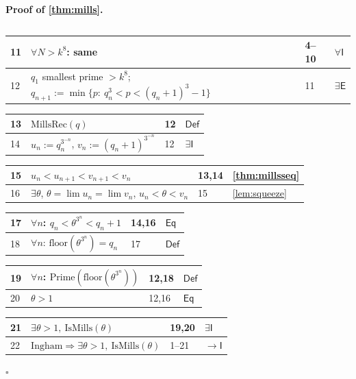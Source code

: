 \documentclass[11pt,reqno]{amsart}
\theoremstyle{blueplain}
\renewcommand{\qedsymbol}{\textcolor{proofqed}{\ensuremath{\square}}}
\renewenvironment{proof}[1][Proof]{\par\noindent\textbf{\textcolor{proofhead}{#1.}}\par\nobreak}{\par\nobreak\hfill\qedsymbol}
\numberwithin{equation}{section}
\begin{document}
\begin{proof}[\textbf{Proof of \cref{thm:mills}}]
{\begin{tabular}{|m{0.7cm}|m{12cm}|m{1.4cm}|m{2.5cm}|}
		\end{tabular}%
		\noindent \newline
		\noindent
		\begin{tabular}{|m{0.7cm}|m{12cm}|m{1.4cm}|m{2.5cm}|}
			\hline
			11 & $\forall N>k^{8}$: same & 4--10 & $\forall\mathsf{I}$ \\ \hline
			12 & $q_1$ smallest prime $>k^{8}$; $q_{n+1}:=\min\{p:\ q_n^{3}<p<(q_n+1)^{3}-1\}$ & 11 & $\exists\mathsf{E}$ \\
		\end{tabular}%
		\noindent \newline
		\noindent
		\begin{tabular}{|m{0.7cm}|m{12cm}|m{1.4cm}|m{2.5cm}|}
			\hline
			13 & $\mathrm{MillsRec}(q)$ & 12 & $\mathsf{Def}$ \\ \hline
			14 & $u_n:=q_n^{3^{-n}}$, $v_n:=(q_n+1)^{3^{-n}}$ & 12 & $\exists\mathsf{I}$ \\
		\end{tabular}%
		\noindent \newline
		\noindent
		\begin{tabular}{|m{0.7cm}|m{12cm}|m{1.4cm}|m{2.5cm}|}
			\hline
			15 & $u_n<u_{n+1}<v_{n+1}<v_n$ & 13,14 & \cref{thm:millsseq} \\ \hline
			16 & $\exists\theta$, $\theta=\lim u_n=\lim v_n$, $u_n<\theta<v_n$ & 15 & \cref{lem:squeeze} \\
		\end{tabular}%
		\noindent \newline
		\noindent
		\begin{tabular}{|m{0.7cm}|m{12cm}|m{1.4cm}|m{2.5cm}|}
			\hline
			17 & $\forall n$: $q_n<\theta^{3^{n}}<q_n+1$ & 14,16 & $\mathsf{Eq}$ \\ \hline
			18 & $\forall n$: $\mathrm{floor}(\theta^{3^{n}})=q_n$ & 17 & $\mathsf{Def}$ \\
		\end{tabular}%
		\noindent \newline
		\noindent
		\begin{tabular}{|m{0.7cm}|m{12cm}|m{1.4cm}|m{2.5cm}|}
			\hline
			19 & $\forall n$: $\mathrm{Prime}(\mathrm{floor}(\theta^{3^{n}}))$ & 12,18 & $\mathsf{Def}$ \\ \hline
			20 & $\theta>1$ & 12,16 & $\mathsf{Eq}$ \\
		\end{tabular}%
		\noindent \newline
		\noindent
		\begin{tabular}{|m{0.7cm}|m{12cm}|m{1.4cm}|m{2.5cm}|}
			\hline
			21 & $\exists\theta>1,\ \mathrm{IsMills}(\theta)$ & 19,20 & $\exists\mathsf{I}$ \\ \hline
			22 & $\text{Ingham}\Rightarrow\exists\theta>1,\ \mathrm{IsMills}(\theta)$ & 1--21 & $\rightarrow\mathsf{I}$ \\ \hline
		\end{tabular}%
	}
\end{proof}
\end{document}
